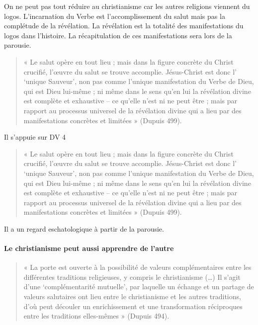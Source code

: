 On ne peut pas tout réduire au christianisme car les autres religions viennent du logos.
L’incarnation du Verbe est l’accomplissement du salut mais pas la complétude de la révélation. La révélation est la totalité des manifestations du logos dans l’histoire. La récapitulation de ces manifestations sera lors de la parousie.
\begin{quote}
    « Le salut opère en tout lieu ; mais dans la figure concrète du Christ crucifié, l’œuvre du salut se trouve accomplie. Jésus-Christ est donc l’ ‘unique Sauveur’, non pas comme l’unique manifestation du Verbe de Dieu, qui est Dieu lui-même ; ni même dans le sens qu’en lui la révélation divine est complète et exhaustive – ce qu’elle n’est ni ne peut être ; mais par rapport au processus universel de la révélation divine qui a lieu par des manifestations concrètes et limitées » (Dupuis 499).
\end{quote}

Il s’appuie sur DV 4
\begin{quote}
« Le salut opère en tout lieu ; mais dans la figure concrète du Christ crucifié, l’œuvre du salut se trouve accomplie. Jésus-Christ est donc l’ ‘unique Sauveur’, non pas comme l’unique manifestation du Verbe de Dieu, qui est Dieu lui-même ; ni même dans le sens qu’en lui la révélation divine est complète et exhaustive – ce qu’elle n’est ni ne peut être ; mais par rapport au processus universel de la révélation divine qui a lieu par des manifestations concrètes et limitées » (Dupuis 499).   
\end{quote}

Il a un regard eschatologique à partir de la parousie.

\paragraph{Le christianisme peut aussi apprendre de l’autre} 

\begin{quote}
    « La porte est ouverte à la possibilité de valeurs complémentaires entre les différentes traditions religieuses, y compris le christianisme (…) Il s’agit d’une ‘complémentarité mutuelle’, par laquelle un échange et un partage de valeurs salutaires ont lieu entre le christianisme et les autres traditions, d’où peut découler un enrichissement et une transformation réciproques entre les traditions elles-mêmes » (Dupuis 494).
\end{quote}


